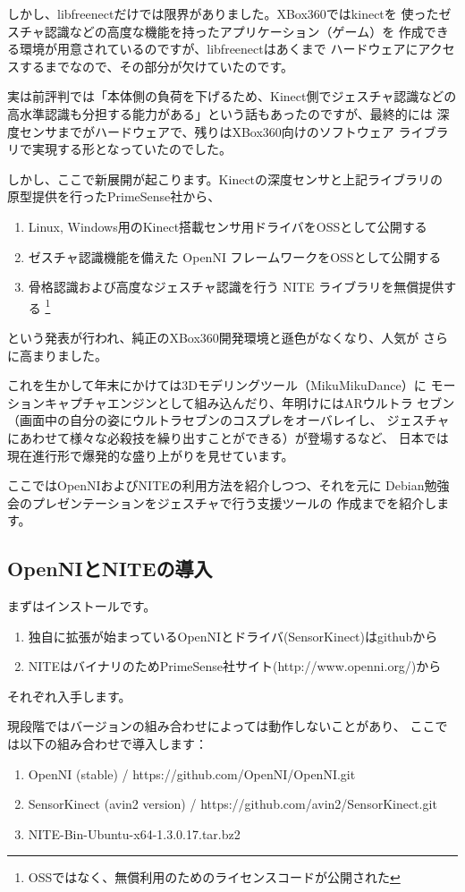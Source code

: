 \documentclass[mingoth,a4paper]{jsarticle}
\begin{document}
しかし、libfreenectだけでは限界がありました。XBox360ではkinectを
使ったゼスチャ認識などの高度な機能を持ったアプリケーション（ゲーム）を
作成できる環境が用意されているのですが、libfreenectはあくまで
ハードウェアにアクセスするまでなので、その部分が欠けていたのです。

実は前評判では「本体側の負荷を下げるため、Kinect側でジェスチャ認識などの
高水準認識も分担する能力がある」という話もあったのですが、最終的には
深度センサまでがハードウェアで、残りはXBox360向けのソフトウェア
ライブラリで実現する形となっていたのでした。

しかし、ここで新展開が起こります。Kinectの深度センサと上記ライブラリの
原型提供を行ったPrimeSense社から、
\begin{enumerate}
\item Linux, Windows用のKinect搭載センサ用ドライバをOSSとして公開する
\item ゼスチャ認識機能を備えた OpenNI フレームワークをOSSとして公開する
\item 骨格認識および高度なジェスチャ認識を行う NITE ライブラリを無償提供する
\footnote{OSSではなく、無償利用のためのライセンスコードが公開された}
\end{enumerate}
という発表が行われ、純正のXBox360開発環境と遜色がなくなり、人気が
さらに高まりました。

これを生かして年末にかけては3Dモデリングツール（MikuMikuDance）に
モーションキャプチャエンジンとして組み込んだり、年明けにはARウルトラ
セブン（画面中の自分の姿にウルトラセブンのコスプレをオーバレイし、
ジェスチャにあわせて様々な必殺技を繰り出すことができる）が登場するなど、
日本では現在進行形で爆発的な盛り上がりを見せています。

ここではOpenNIおよびNITEの利用方法を紹介しつつ、それを元に
Debian勉強会のプレゼンテーションをジェスチャで行う支援ツールの
作成までを紹介します。

\subsection{OpenNIとNITEの導入}
まずはインストールです。
\begin{enumerate}
\item 独自に拡張が始まっているOpenNIとドライバ(SensorKinect)はgithubから
\item NITEはバイナリのためPrimeSense社サイト(http://www.openni.org/)から
\end{enumerate}
それぞれ入手します。

現段階ではバージョンの組み合わせによっては動作しないことがあり、
ここでは以下の組み合わせで導入します：
\begin{enumerate}
\item OpenNI (stable) / https://github.com/OpenNI/OpenNI.git
\item SensorKinect (avin2 version) / https://github.com/avin2/SensorKinect.git
\item NITE-Bin-Ubuntu-x64-1.3.0.17.tar.bz2
\end{enumerate}
\end{document}
